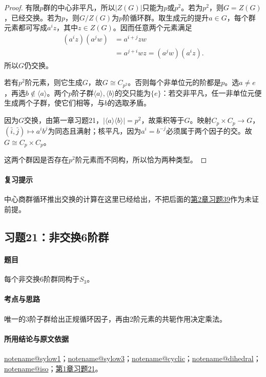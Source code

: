 \documentclass[UTF8,a4paper,11pt,fontset=windows]{ctexart}
\makeatletter
\newcommand{\noteref}[1]{\hyperref[note:#1]{\csname notename@#1\endcsname}}
\newcommand{\exref}[2]{\hyperref[ex:#1:#2]{第#1章习题#2}}
\makeatother
\begin{document}
\begin{proof}
有限$p$群的中心非平凡，所以$|Z(G)|$只能为$p$或$p^2$。若为$p^2$，则$G=Z(G)$，已经交换。若为$p$，则$G/Z(G)$为$p$阶循环群。取生成元的提升$a\in G$，每个群元素都可写成$a^iz$，其中$z\in Z(G)$。因而任意两个元素满足
\begin{align*}
(a^iz)(a^jw)&=a^{i+j}zw\\
&=a^{j+i}wz=(a^jw)(a^iz).
\end{align*}
所以$G$仍交换。

若有$p^2$阶元素，则它生成$G$，故$G\cong C_{p^2}$。否则每个非单位元的阶都是$p$。选$a\ne e$，再选$b\notin\langle a\rangle$。两个$p$阶子群$\langle a\rangle,\langle b\rangle$的交只能为$\{e\}$：若交非平凡，任一非单位元便生成两个子群，使它们相等，与$b$的选取矛盾。

因为$G$交换，由第一章习题21，$|\langle a\rangle\langle b\rangle|=p^2$，故乘积等于$G$。映射$C_p\times C_p\to G$，$(\bar i,\bar j)\mapsto a^ib^j$为同态且满射；核平凡，因为$a^i=b^{-j}$必须属于两个因子的交。故$G\cong C_p\times C_p$。

这两个群因是否存在$p^2$阶元素而不同构，所以恰为两种类型。
\end{proof}

\paragraph{复习提示}
中心商群循环推出交换的计算在这里已经给出，不把后面的\exref{2}{39}作为未证前提。


\subsection{习题21：\texorpdfstring{非交换6阶群}{非交换6阶群}}
\label{ex:2:21}

\paragraph{题目}
每个非交换6阶群同构于$S_3$。

\paragraph{考点与思路}
唯一的3阶子群给出正规循环因子，再由2阶元素的共轭作用决定乘法。

\paragraph{所用结论与原文依据}
\noteref{sylow1}；\noteref{sylow3}；\noteref{cyclic}；\noteref{dihedral}；\noteref{iso}；\exref{1}{21}。
\end{document}
